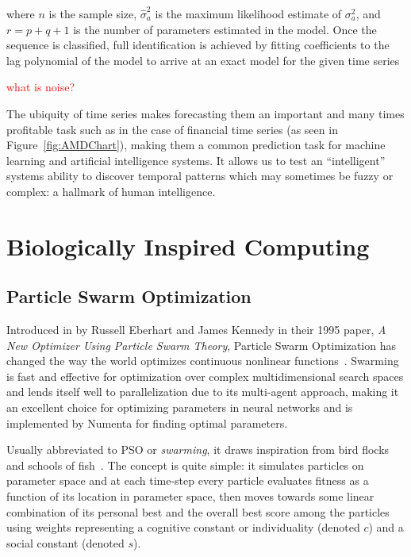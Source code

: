 \documentclass[oneside,12pt,openany]{book}
\begin{document}
	\noindent where $n$ is the sample size, $\hat{\sigma}_{a}^{2}$ is the maximum likelihood estimate of $\sigma_{a}^{2}$, and $r=p+q+1$ is the number of parameters estimated in the model. Once the sequence is classified, full identification is achieved by fitting coefficients to the lag polynomial of the model to arrive at an exact model for the given time series
    
    \textcolor{red}{what is noise?}
	
	The ubiquity of time series makes forecasting them an important and many times profitable task such as in the case of financial time series (as seen in Figure~\ref{fig:AMDChart}), making them a common prediction task for machine learning and artificial intelligence systems. It allows us to test an ``intelligent'' systems ability to discover temporal patterns which may sometimes be fuzzy or complex: a hallmark of human intelligence.
	
	
	
	
	
	
	
	\chapter{Biologically Inspired Computing}
	
	\section{Particle Swarm Optimization}
	
	Introduced in by Russell Eberhart and James Kennedy in their 1995 paper, \textit{A New Optimizer Using Particle Swarm Theory}, Particle Swarm Optimization has changed the way the world optimizes continuous nonlinear functions~\cite{PSOReview}. Swarming is fast and effective for optimization over complex multidimensional search spaces and lends itself well to parallelization due to its multi-agent approach, making it an excellent choice for optimizing parameters in neural networks and is implemented by Numenta for finding optimal parameters.
	
	Usually abbreviated to PSO or \textit{swarming}, it draws inspiration from bird flocks and schools of fish~\cite{Eberhart}. The concept is quite simple: it simulates particles on parameter space and at each time-step every particle evaluates fitness as a function of its location in parameter space, then moves towards some linear combination of its personal best and the overall best score among the particles using weights representing a cognitive constant or individuality (denoted $c$) and a social constant (denoted $s$).
	
\end{document}

